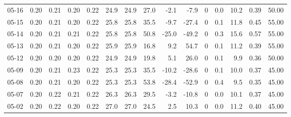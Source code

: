 \begin{threeparttable}
{\begin{tabular}{lrrrrrrrrrrrrrr}
  05-16 &          0.20 &          0.21 &          0.20 &        0.22 &                24.9 &               24.9 &                27.0 &       -2.1 &         -7.9 &              0 &                 0.0 &             10.2 &            0.39 &                  50.00 \\
  05-15 &          0.20 &          0.21 &          0.20 &        0.22 &                25.8 &               25.8 &                35.5 &       -9.7 &        -27.4 &              0 &                 0.1 &             11.8 &            0.45 &                  55.00 \\
  05-14 &          0.20 &          0.21 &          0.21 &        0.22 &                25.8 &               25.8 &                50.8 &      -25.0 &        -49.2 &              0 &                 0.3 &             15.6 &            0.57 &                  55.00 \\
  05-13 &          0.20 &          0.21 &          0.20 &        0.22 &                25.9 &               25.9 &                16.8 &        9.2 &         54.7 &              0 &                 0.1 &             11.2 &            0.39 &                  55.00 \\
  05-12 &          0.20 &          0.20 &          0.20 &        0.22 &                24.9 &               24.9 &                19.8 &        5.1 &         26.0 &              0 &                 0.1 &              9.9 &            0.36 &                  50.00 \\
  05-09 &          0.20 &          0.21 &          0.23 &        0.22 &                25.3 &               25.3 &                35.5 &      -10.2 &        -28.6 &              0 &                 0.1 &             10.0 &            0.37 &                  45.00 \\
  05-08 &          0.20 &          0.21 &          0.20 &        0.22 &                25.3 &               25.3 &                53.8 &      -28.4 &        -52.9 &              0 &                 0.4 &              9.5 &            0.35 &                  45.00 \\
  05-07 &          0.20 &          0.22 &          0.21 &        0.22 &                26.3 &               26.3 &                29.5 &       -3.2 &        -10.8 &              0 &                 0.0 &             10.1 &            0.37 &                  45.00 \\
  05-02 &          0.20 &          0.22 &          0.20 &        0.22 &                27.0 &               27.0 &                24.5 &        2.5 &         10.3 &              0 &                 0.0 &             11.2 &            0.40 &                  45.00 \\

\end{tabular}}
\end{threeparttable}
